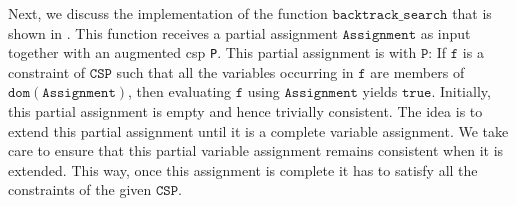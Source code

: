 Next, we discuss the implementation of the function $\texttt{backtrack\_search}$  that is shown in
.  This function receives a partial assignment
$\texttt{Assignment}$ as input together with an augmented \ac{csp} \texttt{P}.  This partial assignment is
 with $\texttt{P}$:  If $\texttt{f}$ is a constraint of $\texttt{CSP}$ such that
all the variables occurring in $\texttt{f}$ are members of $\texttt{dom}(\texttt{Assignment})$, then evaluating
$\texttt{f}$ using $\texttt{Assignment}$ yields $\texttt{true}$.  Initially, this partial assignment is empty
and hence trivially consistent.  The idea is to extend this partial assignment until it is a complete variable 
assignment.  We take care to ensure that this partial variable assignment remains consistent when it is
extended.  This way, once this assignment is complete it has to satisfy all the constraints of the given $\texttt{CSP}$.
